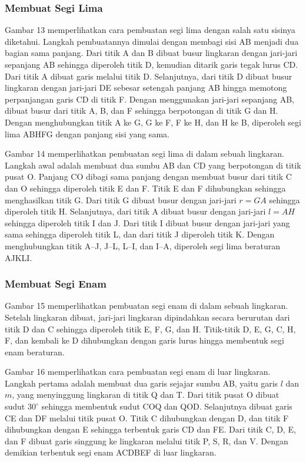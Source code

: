 \documentclass[11pt]{simart} %
\begin{document}
\subsubsection{Membuat Segi Lima}
Gambar 13 memperlihatkan cara pembuatan segi lima dengan salah satu sisinya diketahui. Langkah pembuatannya dimulai dengan membagi sisi AB menjadi dua bagian sama panjang. Dari titik A dan B dibuat busur lingkaran dengan jari-jari sepanjang AB sehingga diperoleh titik D, kemudian ditarik garis tegak lurus CD. Dari titik A dibuat garis melalui titik D. Selanjutnya, dari titik D dibuat busur lingkaran dengan jari-jari DE sebesar setengah panjang AB hingga memotong perpanjangan garis CD di titik F. Dengan menggunakan jari-jari sepanjang AB, dibuat busur dari titik A, B, dan F sehingga berpotongan di titik G dan H. Dengan menghubungkan titik A ke G, G ke F, F ke H, dan H ke B, diperoleh segi lima ABHFG dengan panjang sisi yang sama.

Gambar 14 memperlihatkan pembuatan segi lima di dalam sebuah lingkaran. Langkah awal adalah membuat dua sumbu AB dan CD yang berpotongan di titik pusat O. Panjang CO dibagi sama panjang dengan membuat busur dari titik C dan O sehingga diperoleh titik E dan F. Titik E dan F dihubungkan sehingga menghasilkan titik G. Dari titik G dibuat busur dengan jari-jari $r = GA$ sehingga diperoleh titik H. Selanjutnya, dari titik A dibuat busur dengan jari-jari $l = AH$ sehingga diperoleh titik I dan J. Dari titik I dibuat busur dengan jari-jari yang sama sehingga diperoleh titik L, dan dari titik J diperoleh titik K. Dengan menghubungkan titik A--J, J--L, L--I, dan I--A, diperoleh segi lima beraturan AJKLI.

\subsubsection{Membuat Segi Enam}
Gambar 15 memperlihatkan pembuatan segi enam di dalam sebuah lingkaran. Setelah lingkaran dibuat, jari-jari lingkaran dipindahkan secara berurutan dari titik D dan C sehingga diperoleh titik E, F, G, dan H. Titik-titik D, E, G, C, H, F, dan kembali ke D dihubungkan dengan garis lurus hingga membentuk segi enam beraturan.

Gambar 16 memperlihatkan cara pembuatan segi enam di luar lingkaran. Langkah pertama adalah membuat dua garis sejajar sumbu AB, yaitu garis $l$ dan $m$, yang menyinggung lingkaran di titik Q dan T. Dari titik pusat O dibuat sudut $30^\circ$ sehingga membentuk sudut COQ dan QOD. Selanjutnya dibuat garis CE dan DF melalui titik pusat O. Titik C dihubungkan dengan D, dan titik F dihubungkan dengan E sehingga terbentuk garis CD dan FE. Dari titik C, D, E, dan F dibuat garis singgung ke lingkaran melalui titik P, S, R, dan V. Dengan demikian terbentuk segi enam ACDBEF di luar lingkaran.
\end{document}

